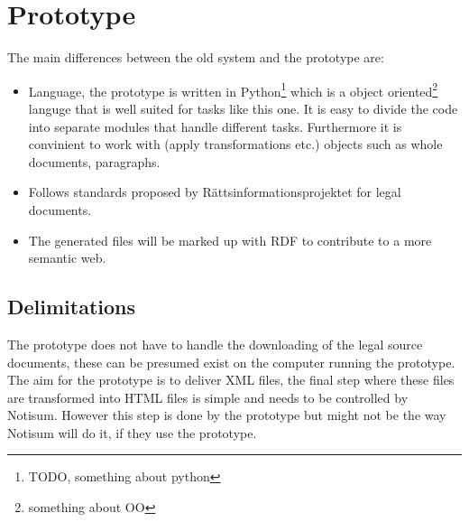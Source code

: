 \section{Prototype}
The main differences between the old system and the prototype are: 
\begin{itemize}
\item Language, the prototype is written in Python\footnote{TODO, something about python} which is a object oriented\footnote{something about OO} languge that is well suited for tasks like this one. It is easy to divide the code into separate modules that handle different tasks. Furthermore it is convinient to work with (apply transformations etc.) objects such as whole documents, paragraphs. 
\item Follows standards proposed by Rättsinformationsprojektet for legal documents.   
\item The generated files will be marked up with RDF to contribute to a more semantic web. 
\end{itemize} 

\subsection{Delimitations}
The prototype does not have to handle the downloading of the legal source documents, these can be presumed exist on the computer running the prototype. \\The aim for the prototype is to deliver XML files, the final step where these files are transformed into HTML files is simple and needs to be controlled by Notisum. However this step is done by the prototype but might not be the way Notisum will do it, if they use the prototype.
